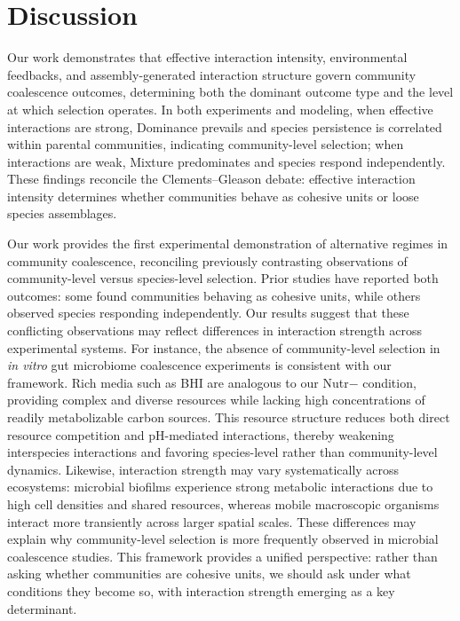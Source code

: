 \section{Discussion}
\label{sec:discussion}


Our work demonstrates that effective interaction intensity, environmental feedbacks, and assembly-generated interaction structure govern community coalescence outcomes, determining both the dominant outcome type and the level at which selection operates. In both experiments and modeling, when effective interactions are strong, Dominance prevails and species persistence is correlated within parental communities, indicating community-level selection; when interactions are weak, Mixture predominates and species respond independently.  These findings reconcile the Clements--Gleason debate: effective interaction intensity determines whether communities behave as cohesive units or loose species assemblages.


Our work provides the first experimental demonstration of alternative regimes in community coalescence, reconciling previously contrasting observations of community-level versus species-level selection. Prior studies have reported both outcomes: some found communities behaving as cohesive units\citep{Tikhonov2016, DiazColunga2022}, while others observed species responding independently\citep{VanderGucht2007, Vermeij1991}. Our results suggest that these conflicting observations may reflect differences in interaction strength across experimental systems. For instance, the absence of community-level selection in \textit{in vitro} gut microbiome coalescence experiments\citep{Goldman2025, Walton2025} is consistent with our framework. Rich media such as BHI are analogous to our Nutr$-$ condition, providing complex and diverse resources while lacking high concentrations of readily metabolizable carbon sources. This resource structure reduces both direct resource competition and pH-mediated interactions, thereby weakening interspecies interactions\citep{Ratzke2020} and favoring species-level rather than community-level dynamics. Likewise, interaction strength may vary systematically across ecosystems: microbial biofilms experience strong metabolic interactions due to high cell densities and shared resources\citep{Nadell2016}, whereas mobile macroscopic organisms interact more transiently across larger spatial scales. These differences may explain why community-level selection is more frequently observed in microbial coalescence studies. This framework provides a unified perspective: rather than asking whether communities are cohesive units, we should ask under what conditions they become so, with interaction strength emerging as a key determinant.


